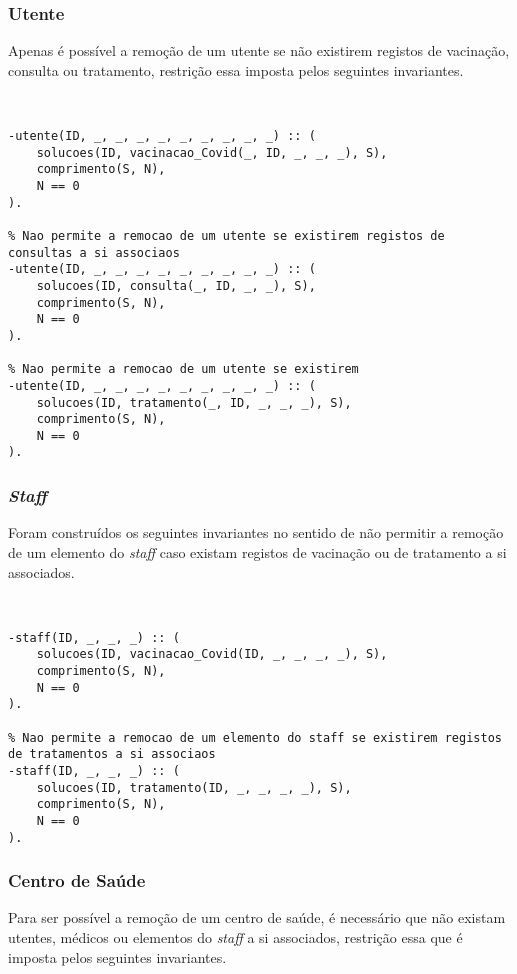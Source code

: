 \subsubsection*{Utente}
Apenas é possível a remoção de um utente se não existirem registos de vacinação, consulta ou 
tratamento, restrição essa
imposta pelos seguintes invariantes.

\

\begin{lstlisting}[caption={Invariantes de remoção relativos ao predicado \texttt{utente}}]
% Nao permite a remocao de um utente se existirem registos de vacinacao a si associados
-utente(ID, _, _, _, _, _, _, _, _, _) :: (
    solucoes(ID, vacinacao_Covid(_, ID, _, _, _), S),
    comprimento(S, N),
    N == 0
).

% Nao permite a remocao de um utente se existirem registos de consultas a si associaos
-utente(ID, _, _, _, _, _, _, _, _, _) :: (
    solucoes(ID, consulta(_, ID, _, _), S),
    comprimento(S, N),
    N == 0
).

% Nao permite a remocao de um utente se existirem
-utente(ID, _, _, _, _, _, _, _, _, _) :: (
    solucoes(ID, tratamento(_, ID, _, _, _), S),
    comprimento(S, N),
    N == 0
).
\end{lstlisting}

\subsubsection*{\textit{Staff}}
Foram construídos os seguintes invariantes no sentido de não permitir a remoção de um elemento 
do \textit{staff}
caso existam registos de vacinação ou de tratamento a si associados.

\

\begin{lstlisting}[caption={Invariantes de remoção relativos ao predicado \texttt{staff}}]
% Nao permite a remocao de um elemento do staff se existirem registos de vacinacao a si associaos
-staff(ID, _, _, _) :: (
    solucoes(ID, vacinacao_Covid(ID, _, _, _, _), S),
    comprimento(S, N),
    N == 0
).

% Nao permite a remocao de um elemento do staff se existirem registos de tratamentos a si associaos
-staff(ID, _, _, _) :: (
    solucoes(ID, tratamento(ID, _, _, _, _), S),
    comprimento(S, N),
    N == 0
).
\end{lstlisting}

\subsubsection*{Centro de Saúde}
Para ser possível a remoção de um centro de saúde, é necessário que não existam utentes, 
médicos ou elementos do \textit{staff}
a si associados, restrição essa que é imposta pelos seguintes invariantes.

